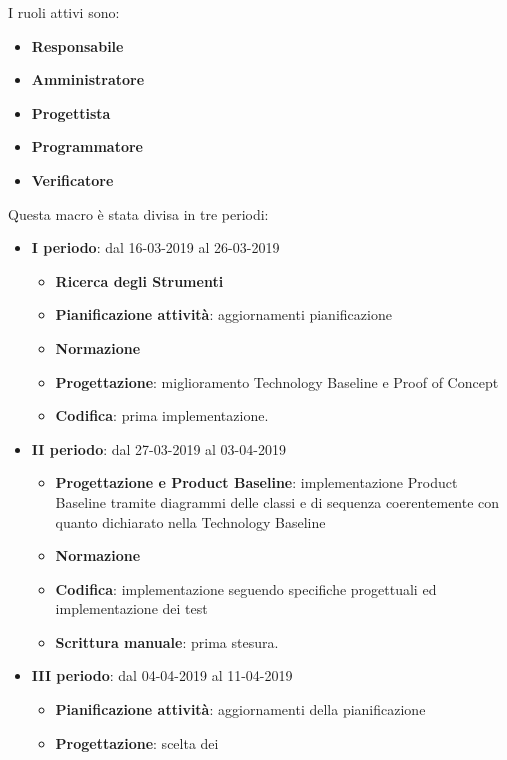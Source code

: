         I ruoli attivi sono: 
        \begin{itemize}
            \item \textbf{Responsabile}
            \item \textbf{Amministratore}
            \item \textbf{Progettista}
            \item \textbf{Programmatore}
            \item \textbf{Verificatore}
        \end{itemize}
        Questa macro è stata divisa in tre periodi:
		\begin{itemize}
			\item \textbf{I periodo}: dal 16-03-2019 al 26-03-2019
			\begin{itemize}
    	        \item \textbf{Ricerca degli Strumenti}
    	        \item \textbf{Pianificazione attività}: aggiornamenti pianificazione
    	        \item \textbf{Normazione}
    	        \item \textbf{Progettazione}: miglioramento Technology Baseline e Proof of Concept
    	        \item \textbf{Codifica}: prima implementazione.
        	\end{itemize}
			\item \textbf{II periodo}: dal 27-03-2019 al 03-04-2019
			\begin{itemize}
				\item \textbf{Progettazione e Product Baseline}: implementazione Product Baseline tramite diagrammi delle classi e di sequenza
				coerentemente con quanto dichiarato nella Technology Baseline
    	        \item \textbf{Normazione}
    	        \item \textbf{Codifica}: implementazione seguendo specifiche progettuali ed implementazione dei test
    	        \item \textbf{Scrittura manuale}: prima stesura.
        	\end{itemize}
        	\item \textbf{III periodo}: dal 04-04-2019 al 11-04-2019
			\begin{itemize}
				\item \textbf{Pianificazione attività}: aggiornamenti della pianificazione
    	        \item \textbf{Progettazione}: scelta dei 

\end{itemize}
\end{itemize}
